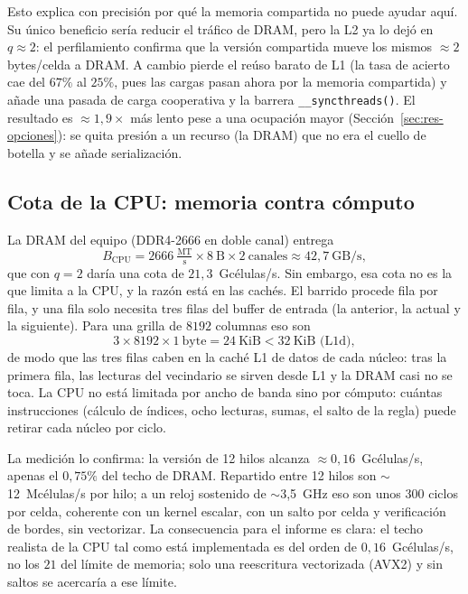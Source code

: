 \documentclass[
	spanish,
	letterpaper, oneside
]{article}
\begin{document}
Esto explica con precisión por qué la memoria compartida no puede ayudar aquí.
Su único beneficio sería reducir el tráfico de DRAM, pero la L2 ya lo dejó en
$q\approx2$: el perfilamiento confirma que la versión compartida mueve los mismos
$\approx2$ bytes/celda a DRAM. A cambio pierde el reúso barato de L1 (la tasa de
acierto cae del $67\%$ al $25\%$, pues las cargas pasan ahora por la memoria compartida)
y añade una pasada de carga cooperativa y la barrera \texttt{\_\_syncthreads()}. El
resultado es $\approx1{,}9\times$ más lento pese a una ocupación mayor
(Sección~\ref{sec:res-opciones}): se quita presión a un recurso (la DRAM) que no era el
cuello de botella y se añade serialización.

\subsection{Cota de la CPU: memoria contra cómputo}
\label{sec:cota-cpu}

La DRAM del equipo (DDR4-2666 en doble canal) entrega
%
\begin{equation}
	B_{\text{CPU}} = 2666\ \tfrac{\text{MT}}{\text{s}} \times 8\ \text{B} \times 2\
	\text{canales} \approx 42{,}7\ \text{GB/s},
	\label{eq:bw-cpu}
\end{equation}
%
que con $q = 2$ daría una cota de $21{,}3$~Gcélulas/s. Sin embargo, esa cota
no es la que limita a la CPU, y la razón está en las cachés. El barrido procede fila
por fila, y una fila solo necesita tres filas del buffer de entrada (la anterior, la
actual y la siguiente). Para una grilla de $8192$ columnas eso son
%
\[
	3 \times 8192 \times 1\ \text{byte} = 24\ \text{KiB} < 32\ \text{KiB (L1d)},
\]
%
de modo que las tres filas caben en la caché L1 de datos de cada núcleo: tras la
primera fila, las lecturas del vecindario se sirven desde L1 y la DRAM casi no se
toca. La CPU no está limitada por ancho de banda sino por cómputo: cuántas
instrucciones (cálculo de índices, ocho lecturas, sumas, el salto de la regla) puede
retirar cada núcleo por ciclo.

La medición lo confirma: la versión de 12 hilos alcanza $\approx 0{,}16$~Gcélulas/s,
apenas el $0{,}75\%$ del techo de DRAM. Repartido entre 12 hilos son
$\sim$12~Mcélulas/s por hilo; a un reloj sostenido de $\sim$3{,}5~GHz eso son unos
300 ciclos por celda, coherente con un kernel escalar, con un salto
por celda y verificación de bordes, sin vectorizar. La consecuencia para el informe
es clara: el techo realista de la CPU tal como está implementada es del orden
de $0{,}16$~Gcélulas/s, no los $21$ del límite de memoria; solo una reescritura
vectorizada (AVX2) y sin saltos se acercaría a ese límite.
\end{document}
